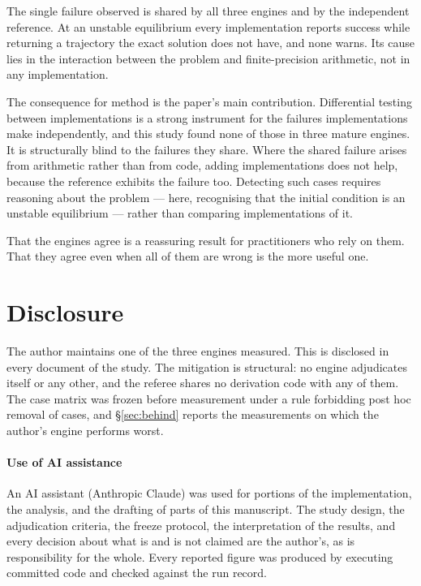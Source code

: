 \documentclass[review,12pt]{elsarticle}
\begin{document}
The single failure observed is shared by all three engines and by the
independent reference. At an unstable equilibrium every implementation reports
success while returning a trajectory the exact solution does not have, and none
warns. Its cause lies in the interaction between the problem and
finite-precision arithmetic, not in any implementation.

The consequence for method is the paper's main contribution. Differential
testing between implementations is a strong instrument for the failures
implementations make independently, and this study found none of those in three
mature engines. It is structurally blind to the failures they share. Where the
shared failure arises from arithmetic rather than from code, adding
implementations does not help, because the reference exhibits the failure too.
Detecting such cases requires reasoning about the problem --- here, recognising
that the initial condition is an unstable equilibrium --- rather than comparing
implementations of it.

That the engines agree is a reassuring result for practitioners who rely on
them. That they agree even when all of them are wrong is the more useful one.

\section*{Disclosure}\label{sec:disclosure}

The author maintains one of the three engines measured. This is disclosed in
every document of the study. The mitigation is structural: no engine adjudicates
itself or any other, and the referee shares no derivation code with any of them.
The
case matrix was frozen before measurement under a rule forbidding post hoc
removal of cases, and \S\ref{sec:behind} reports the measurements on which the
author's engine performs worst.

\paragraph{Use of AI assistance}
An AI assistant (Anthropic Claude) was used for portions of the implementation,
the analysis, and the drafting of parts of this manuscript. The study design, the
adjudication criteria, the freeze protocol, the interpretation of the results,
and every decision about what is and is not claimed are the author's, as is
responsibility for the whole. Every reported figure was produced by executing
committed code and checked against the run record.
\end{document}
